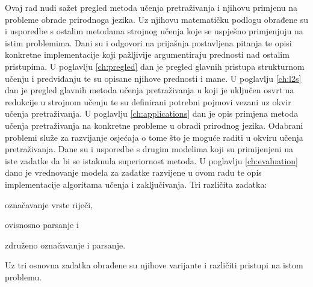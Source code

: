 Ovaj rad nudi sažet pregled metoda učenja pretraživanja i njihovu
primjenu na probleme obrade prirodnoga jezika. Uz njihovu matematičku podlogu
obrađene su i usporedbe s ostalim metodama strojnog učenja koje se uspješno
primjenjuju na istim problemima. Dani su i odgovori na prijašnja postavljena
pitanja te opisi konkretne implementacije koji pažljivije argumentiraju
prednosti nad ostalim pristupima.
U poglavlju \ref{ch:pregled} dan je pregled glavnih pristupa strukturnom
učenju i predviđanju te su opisane njihove prednosti i mane.
U poglavlju \ref{ch:l2s} dan je pregled glavnih metoda učenja pretraživanja
u koji je uključen osvrt na redukcije u strojnom učenju te su definirani
potrebni pojmovi vezani uz okvir učenja pretraživanja.
U poglavlju \ref{ch:applications} dan je opis primjena metoda učenja
pretraživanja na konkretne probleme u obradi prirodnog jezika. Odabrani problemi
služe za razvijanje osjećaja o tome što je moguće raditi u okviru učenja
pretraživanja. Dane su i usporedbe s drugim modelima koji su primijenjeni na
iste zadatke da bi se istaknula superiornost \lts{} metoda.
U poglavlju \ref{ch:evaluation} dano je vrednovanje modela za zadatke
razvijene u ovom radu te opis implementacije algoritama učenja i zaključivanja.
Tri različita zadatka:
\begin{inlinelist}
  \item označavanje vrste riječi,
  \item ovisnosno parsanje i
  \item združeno označavanje i parsanje.
\end{inlinelist}
Uz tri osnovna zadatka obrađene su njihove varijante i različiti pristupi na
istom problemu.
